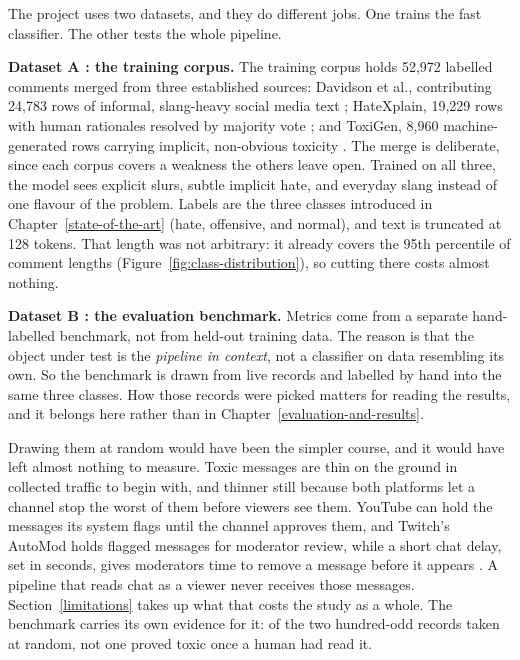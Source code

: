 The project uses two datasets, and they do different jobs. One trains the fast classifier. The other tests the whole pipeline.

\textbf{Dataset A : the training corpus.} The training corpus holds 52,972 labelled comments merged from three established sources: Davidson et al., contributing 24,783 rows of informal, slang-heavy social media text \citep{davidson2017}; HateXplain, 19,229 rows with human rationales resolved by majority vote \citep{hatexplain2021}; and ToxiGen, 8,960 machine-generated rows carrying implicit, non-obvious toxicity \citep{toxigen2022}. The merge is deliberate, since each corpus covers a weakness the others leave open. Trained on all three, the model sees explicit slurs, subtle implicit hate, and everyday slang instead of one flavour of the problem. Labels are the three classes introduced in Chapter~\ref{state-of-the-art} (hate, offensive, and normal), and text is truncated at 128 tokens. That length was not arbitrary: it already covers the 95th percentile of comment lengths (Figure~\ref{fig:class-distribution}), so cutting there costs almost nothing.

\textbf{Dataset B : the evaluation benchmark.} Metrics come from a separate hand-labelled benchmark, not from held-out training data. The reason is that the object under test is the \emph{pipeline in context}, not a classifier on data resembling its own. So the benchmark is drawn from live records and labelled by hand into the same three classes. How those records were picked matters for reading the results, and it belongs here rather than in Chapter~\ref{evaluation-and-results}.

Drawing them at random would have been the simpler course, and it would have left almost nothing to measure. Toxic messages are thin on the ground in collected traffic to begin with, and thinner still because both platforms let a channel stop the worst of them before viewers see them. YouTube can hold the messages its system flags until the channel approves them, and Twitch's AutoMod holds flagged messages for moderator review, while a short chat delay, set in seconds, gives moderators time to remove a message before it appears \citep{youtubelivechat2026, twitchapi2026}. A pipeline that reads chat as a viewer never receives those messages. Section~\ref{limitations} takes up what that costs the study as a whole. The benchmark carries its own evidence for it: of the two hundred-odd records taken at random, not one proved toxic once a human had read it.

